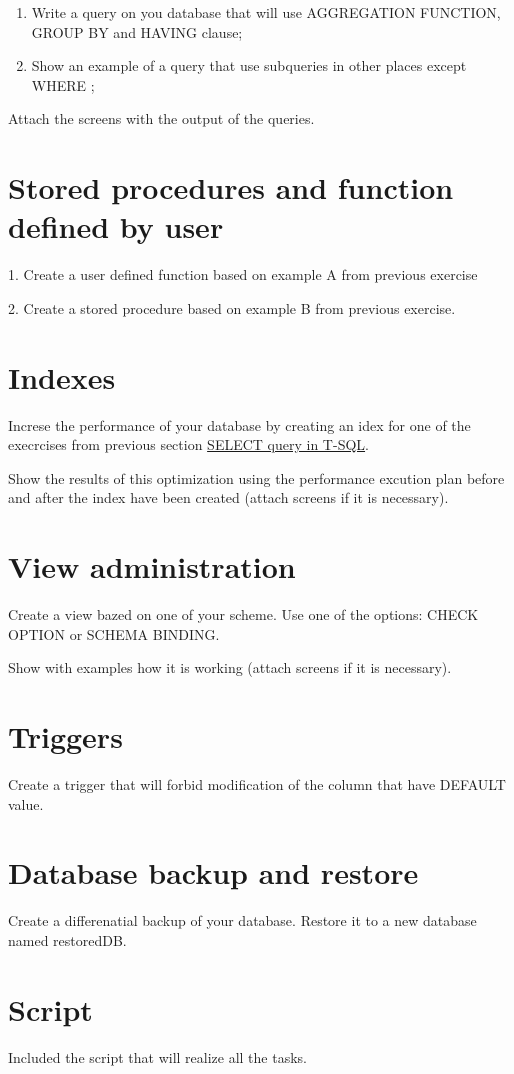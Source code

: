 \begin{enumerate}[itemsep=2pt]
\item Write a query on you database that will use AGGREGATION FUNCTION, GROUP BY and HAVING clause;
\item Show an example of a query that use subqueries in other places except WHERE ;
\end{enumerate}

Attach the screens with the output of the queries.

\section{Stored procedures and function defined by user}

1. Create a user defined function based on example A from previous exercise

2. Create a stored procedure based on example B from previous exercise. 

\section{Indexes}

Increse the performance of your database by creating an idex for one of the execrcises from previous section \hyperref[sec:select]{SELECT query in T-SQL}. 

Show the results of this optimization using the performance excution plan before and after the index have been created (attach screens if it is necessary).


\section{View administration}

Create a view bazed on one of your scheme. Use one of the options: CHECK OPTION or SCHEMA BINDING. 

Show with examples how it is working (attach screens if it is necessary).

\section{Triggers}

Create a trigger that will forbid modification of the column that have DEFAULT value.

\section{Database backup and restore}

Create a differenatial backup of your database. Restore it to a new database named restoredDB.

\section{Script}

Included the script that will realize all the tasks.



\clearpage